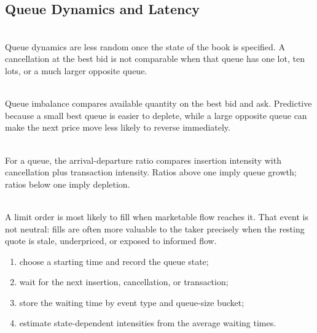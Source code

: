 \subsection{Queue Dynamics and Latency}

\begin{principle} \\
Queue dynamics are less random once the state of the book is specified. A cancellation at the best bid is not comparable when that queue has one lot, ten lots, or a much larger opposite queue.
\end{principle}

\begin{definition} \\
Queue imbalance compares available quantity on the best bid and ask. Predictive because a small best queue is easier to deplete, while a large opposite queue can make the next price move less likely to reverse immediately.
\end{definition}

\begin{mechanism} \\
For a queue, the arrival-departure ratio compares insertion intensity with cancellation plus transaction intensity. Ratios above one imply queue growth; ratios below one imply depletion.
\end{mechanism}

\begin{caveat} \\
A limit order is most likely to fill when marketable flow reaches it. That event is not neutral: fills are often more valuable to the taker precisely when the resting quote is stale, underpriced, or exposed to informed flow.
\end{caveat}

\begin{process} 
\begin{enumerate}[label=\roman*.]
\setlength{\itemsep}{0pt}
\item choose a starting time and record the queue state;
\item wait for the next insertion, cancellation, or transaction;
\item store the waiting time by event type and queue-size bucket;
\item estimate state-dependent intensities from the average waiting times.
\end{enumerate}
\end{process}

